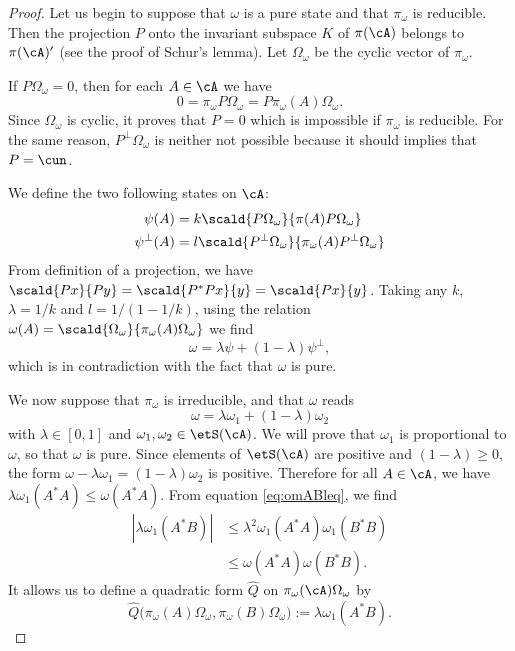 \begin{proof}
Let us begin to suppose that $\omega$ is a pure state and that $\pi_{\omega}$ is reducible. Then the projection $P$ onto the invariant subspace $K$ of $\pi(\cA)$ belongs to $\pi(\cA)'$ (see the proof of Schur's lemma). Let $\Omega_{\omega}$ be the cyclic vector of $\pi_{\omega}$.

If $P\Omega_{\omega}=0$, then for each $A\in\cA$ we have
\[
  0=\pi_{\omega}P\Omega_{\omega}=P\pi_{\omega}(A)\Omega_{\omega}.
\]
Since $\Omega_{\omega}$ is cyclic, it proves that $P=0$ which is impossible if $\pi_{\omega}$ is reducible. For the same reason, $P^{\perp}\Omega_{\omega}$ is neither not possible because it should implies that $P=\cun$.

We define the two following states on $\cA$:
\begin{subequations}
\begin{align}
  \psi(A)&=k\scald{ P\Omega_{\omega} }{ \pi(A)P\Omega_{\omega} }\\
  \psi^{\perp}(A)&=l\scald{ P^{\perp}\Omega_{\omega} }{ \pi_{\omega}(A)P^{\perp}\Omega_{\omega} }
\end{align}
\end{subequations}
From definition of a projection, we have $\scald{ Px }{ Py }=\scald{ P^*Px }{ y }=\scald{ Px }{ y }$. Taking any $k$, $\lambda=1/k$ and $l=1/(1-1/k)$, using the relation $\omega(A)=\scald{ \Omega_{\omega} }{ \pi_{\omega}(A)\Omega_{\omega} }$ we find
\[
  \omega=\lambda\psi+(1-\lambda)\psi^{\perp},
\]
which is in contradiction with the fact that $\omega$ is pure.

We now suppose that $\pi_{\omega}$ is irreducible, and that $\omega$ reads
\[
  \omega=\lambda\omega_1+(1-\lambda)\omega_2
\]
with $\lambda\in[0,1]$ and $\omega_1,\omega_2\in\etS(\cA)$. We will prove that $\omega_1$ is proportional to $\omega$, so that $\omega$ is pure. Since elements of $\etS(\cA)$ are positive and $(1-\lambda)\geq0$, the form $\omega-\lambda\omega_1=(1-\lambda)\omega_2$ is positive. Therefore for all $A\in\cA$, we have $\lambda\omega_1(A^*A)\leq\omega(A^*A)$. From equation \eqref{eq:omABleq}, we find
%
\begin{equation} \label{eq_r19031}
\begin{split}
| \lambda\omega_1(A^*B) |&\leq\lambda^2\omega_1(A^*A)\omega_1(B^*B)\\
        &\leq\omega(A^*A)\omega(B^*B).
\end{split}
\end{equation}
It allows us to define a quadratic form $\hat Q$ on $\pi_{\omega}(\cA)\Omega_{\omega}$ by
\begin{equation}
\hat Q\big( \pi_{\omega}(A)\Omega_{\omega},\pi_{\omega}(B)\Omega_{\omega} \big):=\lambda\omega_1(A^*B).
\end{equation}


\end{proof}
